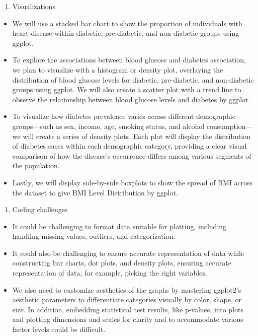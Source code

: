\documentclass[
]{article}
\providecommand{\tightlist}{%
  \setlength{\itemsep}{0pt}\setlength{\parskip}{0pt}}
\begin{document}
\begin{enumerate}
\def\labelenumi{\arabic{enumi}.}
\setcounter{enumi}{5}
\tightlist
\item
  Visualizations
\end{enumerate}

\begin{itemize}
\item
  We will use a stacked bar chart to show the proportion of individuals
  with heart disease within diabetic, pre-diabetic, and non-diabetic
  groups using ggplot.
\item
  To explore the associations between blood glucose and diabetes
  association, we plan to visualize with a histogram or density plot,
  overlaying the distribution of blood glucose levels for diabetic,
  pre-diabetic, and non-diabetic groups using ggplot. We will also
  create a scatter plot with a trend line to observe the relationship
  between blood glucose levels and diabetes by ggplot.
\item
  To visualize how diabetes prevalence varies across different
  demographic groups---such as sex, income, age, smoking status, and
  alcohol consumption---we will create a series of density plots. Each
  plot will display the distribution of diabetes cases within each
  demographic category, providing a clear visual comparison of how the
  disease's occurrence differs among various segments of the population.
\item
  Lastly, we will display side-by-side boxplots to show the spread of
  BMI across the dataset to give BMI Level Distribution by ggplot.
\end{itemize}

\begin{enumerate}
\def\labelenumi{\arabic{enumi}.}
\setcounter{enumi}{6}
\tightlist
\item
  Coding challenges
\end{enumerate}

\begin{itemize}
\item
  It could be challenging to format data suitable for plotting,
  including handling missing values, outliers, and categorization.
\item
  It could also be challenging to ensure accurate representation of data
  while constructing bar charts, dot plots, and density plots, ensuring
  accurate representation of data, for example, picking the right
  variables.
\item
  We also need to customize aesthetics of the graphs by mastering
  ggplot2's aesthetic parameters to differentiate categories visually by
  color, shape, or size. In addition, embedding statistical test
  results, like p-values, into plots and plotting dimensions and scales
  for clarity and to accommodate various factor levels could be
  difficult.
\end{itemize}
\end{document}
